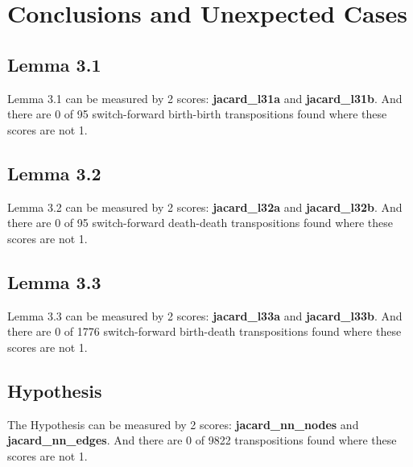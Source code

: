 \documentclass{article}
\begin{document}
\section{Conclusions and Unexpected Cases}
\subsection{Lemma 3.1}

\par Lemma 3.1 can be measured by 2 scores: \textbf{jacard\_l31a} and \textbf{jacard\_l31b}.
And there are 0 of 95 switch-forward birth-birth transpositions found where these scores are not 1.

\subsection{Lemma 3.2}

\par Lemma 3.2 can be measured by 2 scores: \textbf{jacard\_l32a} and \textbf{jacard\_l32b}.
And there are 0 of 95 switch-forward death-death transpositions found where these scores are not 1.

\subsection{Lemma 3.3}

\par Lemma 3.3 can be measured by 2 scores: \textbf{jacard\_l33a} and \textbf{jacard\_l33b}.
And there are 0 of 1776 switch-forward birth-death transpositions found where these scores are not 1.

\subsection{Hypothesis}

\par The Hypothesis can be measured by 2 scores: \textbf{jacard\_nn\_nodes} and \textbf{jacard\_nn\_edges}.
And there are 0 of 9822 transpositions found where these scores are not 1.
\end{document}
